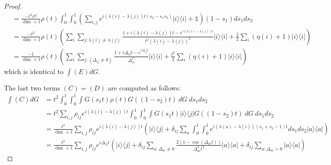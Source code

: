 \documentclass{article}
\newcommand{\ketbra}[2]{| #1\rangle\! \langle #2|}
\newcommand{\parens}[1]{\left( #1 \right)}
\newcommand{\identity}{\mathds{1}}
\begin{document}
\begin{proof}
\begin{align}
    &= \frac{- t^2 \sigma ^2}{\dim + 1} \rho(t) \int_0^1 \int_0^1 \parens{\sum_{i,j} e^{i(\lambda(i) - \lambda(j))t (s_2 - s_1 s_2)}\ketbra{i}{i} + \identity} (1-s_1) ds_1 ds_2 \\
    &= \frac{- t^2 }{\dim + 1} \rho(t) \parens{\sum_{i} \sum_{j : \lambda(i) \neq \lambda(j)} \frac{1 + i (\lambda(i) - \lambda(j))t - e^{i (\lambda(i) - \lambda(j))t}}{t^2 (\lambda(i) - \lambda(j))^2} \ketbra{i}{i} +\frac{1}{2} \sum_{i} (\eta(i) + 1) \ketbra{i}{i}} \\
    &= \frac{- 1}{\dim + 1} \rho(t) \parens{\sum_i \sum_{j: (\Delta_{ij} \neq 0)} \frac{1 + i \Delta_{ij}t - e^{i\Delta_{ij}t}}{\Delta_{ij}^2} \ketbra{i}{i} + \frac{t^2}{2}\sum_i (\eta(i) + 1) \ketbra{i}{i}}
\end{align}
 which is identical to $\int (E) dG$.

 The last two terms $(C) = (D)$ are computed as follows:
 \begin{align}
     \int (C) dG &= t^2 \int_0^1 \int_0^1 \int G(s_1 t) \rho(t) G((1-s_2)t) ~dG ~ ds_1 ds_2 \\
     &= t^2 \sum_{i,j} \rho_{ij} e^{i(\lambda(i) - \lambda(j))t} \int_0^1 \int_0^1 \int G(s_1 t) \ketbra{i}{j} G((1-s_2)t) ~ dG ~ ds_1 ds_2 \\
     &= \frac{ t^2}{\dim + 1} \sum_{i,j} \rho_{ij} e^{i(\lambda(i) - \lambda(j))t} \parens{ \ketbra{i}{j} + \delta_{ij} \sum_{a} \int_0^1 \int_0^1 e^{i(\lambda(a) - \lambda(i))(s_1 + s_2 - 1)t} ds_1 ds_2 \ketbra{a}{a}} \\
     &= \frac{ t^2}{\dim + 1} \sum_{i,j} \rho_{ij} e^{i \Delta_{ij} t} \parens{\ketbra{i}{j} + \delta_{ij} \sum_{a : \Delta_{ai} \neq 0} \frac{2( 1- \cos (\Delta_{ai} t))}{\Delta_{ai}^2 t^2} \ketbra{a}{a} + \delta_{ij} \sum_{a : \Delta_{ai} = 0} \ketbra{a}{a}}
 \end{align}


\end{proof}
\end{document}
